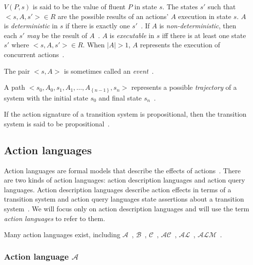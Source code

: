 $ V(P,s) $ is said to be the value of fluent $ P $ in state $ s $.
The states $ s' $ such that $ <s, A, s'> \in R $ are the possible results of an actions' $ A $ execution in state $ s $.
$ A $ is \textit{deterministic} in $ s $ if there is exactly one $ s' $~\citep{gelfond_action_1998}.
If $ A $ is \textit{non-deterministic}, then each $ s' $ \textit{may} be the result of $ A $~\citep{blount_architecture_2013}.
$ A $ is \textit{executable} in $ s $ iff there is at least one state $ s' $ where $ <s, A, s'> \in R $.
When $ \left|A\right|>1 $, $A$ represents the execution of concurrent actions~\citep{gelfond_action_1998, blount_architecture_2013}.

The pair $<s, A>$ is sometimes called an \textit{event}~\citep{gelfond_authorization_2008}.

A path $ <s_0, A_0, s_1, A_1, \dots, A_{\left\{n-1\right\}}, s_n> $ represents a possible \textit{trajectory} of a system with the initial state $ s_0 $ and final state $ s_n $~\citep{blount_architecture_2013}.

If the action signature of a transition system is propositional, then the transition system is said to be propositional~\citep{gelfond_action_1998}.

\subsection{Action languages}
\label{subsec:action_languages}

Action languages are formal models that describe the effects of actions~\citep{gelfond_action_1998}.
There are two kinds of action languages: action description languages and action query languages.
Action description languages describe action effects in terms of a transition system and action query languages state assertions about a transition system~\citep{gelfond_action_1998}.
We will focus only on action description languages and will use the term \textit{action languages} to refer to them.

Many action languages exist, including $ \mathcal{A} $~\citep{gelfond_action_1998}, $ \mathcal{B} $~\citep{gelfond_action_1998}, $ \mathcal{C} $~\citep{gelfond_action_1998}, $ \mathcal{AC} $~\citep{turner_representing_1997}, $ \mathcal{AL} $~\citep{baral_reasoning_2000}, $ \mathcal{ALM} $~\citep{inclezan_modular_2016}.

\subsubsection{Action language $ \mathcal{A} $}
\label{subsubsec:action_language_a}

